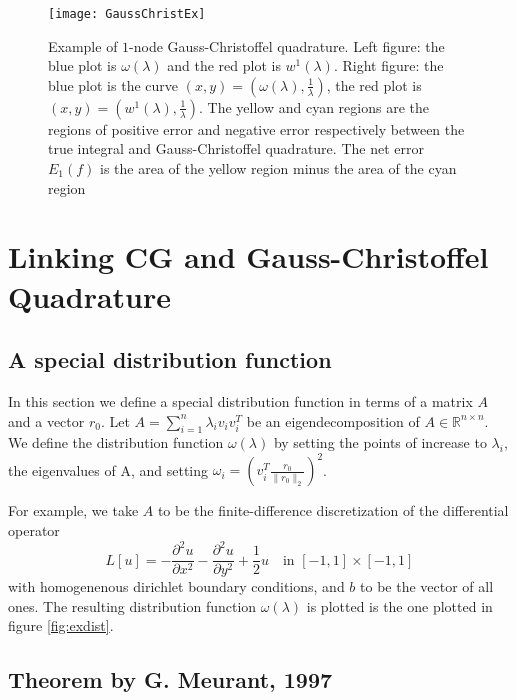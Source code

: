 \documentclass[10pt,a4paper]{article}
\begin{document}
\begin{figure}[h]
  \centering
\texttt{[image: GaussChristEx]}
  \caption{Example of $1$-node Gauss-Christoffel quadrature. Left figure: the blue plot is $\omega(\lambda)$ and the red plot is $w^1(\lambda)$. Right figure: the blue plot is the curve $(x,y) = \left( \omega(\lambda), \frac{1}{\lambda}\right) $, the red plot is $(x,y) = \left( w^1(\lambda), \frac{1}{\lambda}\right) $. The yellow and cyan regions are the regions of positive error and negative error respectively between the true integral and Gauss-Christoffel quadrature. The net error $E_1(f)$ is the area of the yellow region minus the area of the cyan region \label{fig:GaussChristEx}}
\end{figure}




\section{Linking CG and Gauss-Christoffel Quadrature} \label{sec:theorem}

\subsection{A special distribution function}
In this section we define a special distribution function in terms of a matrix $A$ and a vector $r_0$.
Let $A= \sum_{i=1}^n \lambda_i v_i v_i^T$ be an eigendecomposition of $A \in \mathbb{R}^{n \times n}$. 
We define the distribution function $\omega(\lambda)$ by setting the points of increase to $\lambda_i$, the eigenvalues of A, and setting  $\omega_i = \left( v_i^T  \frac{r_0}{\|r_0\|_2}  \right)^2$. 

For example, we take $A$ to be the finite-difference discretization of the differential operator 
\begin{equation} \label{eq:Lu}
L[u] = - \frac{ \partial^2 u }{ \partial x^2 } -  \frac{ \partial^2 u }{ \partial y^2 } + \frac{1}{2} u \quad {\text{in }} \left[ -1 , 1 \right] \times \left[ -1 , 1 \right]  
\end{equation}
 with homogenenous dirichlet boundary conditions, and $b$ to be the vector of all ones. The resulting distribution function $\omega(\lambda)$ is plotted is the one plotted in figure \ref{fig:exdist}.


\subsection{Theorem by G. Meurant, 1997}
\end{document}
